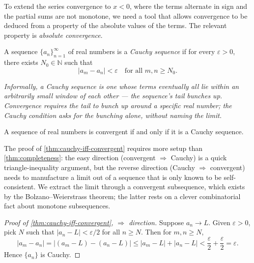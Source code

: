 To extend the series convergence to \(x < 0\), where the terms alternate in sign and the partial sums are not monotone, we need a tool that allows convergence to be deduced from a property of the absolute values of the terms. The relevant property is \emph{absolute convergence}.

\begin{definition}\label{def:cauchy-sequence}
A sequence \(\{a_{n}\}_{n = 1}^{\infty}\) of real numbers is a \emph{Cauchy sequence} if for every \(\varepsilon > 0\), there exists \(N_{0} \in \mathbb{N}\) such that
\[
\lvert a_{m} - a_{n} \rvert < \varepsilon \quad \text{for all } m, n \geq N_{0}.
\]

\emph{Informally, a Cauchy sequence is one whose terms eventually all lie within an arbitrarily small window of each other --- the sequence's tail bunches up. Convergence requires the tail to bunch up around a specific real number; the Cauchy condition asks for the bunching alone, without naming the limit.}
\end{definition}

\begin{theorem}\label{thm:cauchy-iff-convergent}
A sequence of real numbers is convergent if and only if it is a Cauchy sequence.
\end{theorem}

The proof of \cref{thm:cauchy-iff-convergent} requires more setup than \cref{thm:completeness}: the easy direction (convergent \(\Rightarrow\) Cauchy) is a quick triangle-inequality argument, but the reverse direction (Cauchy \(\Rightarrow\) convergent) needs to manufacture a limit out of a sequence that is only known to be self-consistent. We extract the limit through a convergent subsequence, which exists by the Bolzano--Weierstrass theorem; the latter rests on a clever combinatorial fact about monotone subsequences.

\begin{proof}[Proof of \cref{thm:cauchy-iff-convergent}, \(\Rightarrow\) direction]
Suppose \(a_{n} \to L\). Given \(\varepsilon > 0\), pick \(N\) such that \(\lvert a_{n} - L \rvert < \varepsilon / 2\) for all \(n \geq N\). Then for \(m, n \geq N\),
\[
\lvert a_{m} - a_{n} \rvert
= \lvert (a_{m} - L) - (a_{n} - L) \rvert
\leq \lvert a_{m} - L \rvert + \lvert a_{n} - L \rvert
< \frac{\varepsilon}{2} + \frac{\varepsilon}{2}
= \varepsilon.
\]
Hence \(\{a_{n}\}\) is Cauchy.
\end{proof}

